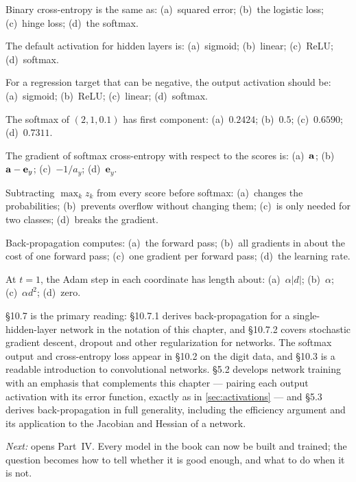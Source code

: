 
\qz Binary cross-entropy is the same as: (a)~squared error; (b)~the logistic
loss; (c)~hinge loss; (d)~the softmax.

\qz The default activation for hidden layers is: (a)~sigmoid; (b)~linear;
(c)~ReLU; (d)~softmax.

\qz For a regression target that can be negative, the output activation should
be: (a)~sigmoid; (b)~ReLU; (c)~linear; (d)~softmax.

\qz The softmax of $(2, 1, 0.1)$ has first component: (a)~$0.2424$; (b)~$0.5$;
(c)~$0.6590$; (d)~$0.7311$.

\qz The gradient of softmax cross-entropy with respect to the scores is:
(a)~$\mathbf{a}$; (b)~$\mathbf{a} - \mathbf{e}_y$; (c)~$-1/a_y$; (d)~$\mathbf{e}_y$.

\qz Subtracting $\max_k z_k$ from every score before softmax: (a)~changes the
probabilities; (b)~prevents overflow without changing them; (c)~is only needed
for two classes; (d)~breaks the gradient.

\qz Back-propagation computes: (a)~the forward pass; (b)~all gradients in about
the cost of one forward pass; (c)~one gradient per forward pass; (d)~the
learning rate.

\qz At $t = 1$, the Adam step in each coordinate has length about:
(a)~$\alpha|d|$; (b)~$\alpha$; (c)~$\alpha d^2$; (d)~zero.

\furtherreading

\textcite{james2021} §10.7 is the primary reading: §10.7.1 derives
back-propagation for a single-hidden-layer network in the notation of this
chapter, and §10.7.2 covers stochastic gradient descent, dropout and other
regularization for networks. The softmax output and cross-entropy loss appear
in §10.2 on the digit data, and §10.3 is a readable introduction to
convolutional networks. \textcite{bishop2006} §5.2 develops network training
with an emphasis that complements this chapter --- pairing each output
activation with its error function, exactly as in \cref{sec:activations} --- and
§5.3 derives back-propagation in full generality, including the efficiency
argument and its application to the Jacobian and Hessian of a network.

\bigskip
\noindent\emph{Next:}  opens Part~IV. Every model in the book can
now be built and trained; the question becomes how to tell whether it is good
enough, and what to do when it is not.
